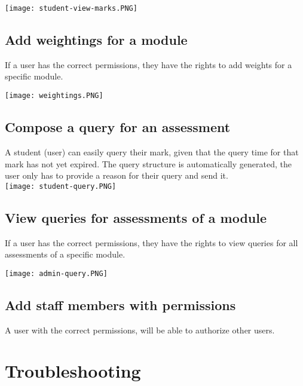 \documentclass[a4paper,12pt]{article}
\begin{document}
        \texttt{[image: student-view-marks.PNG]}\\[1.0cm]
        
        \subsection{Add weightings for a module}
        
        If a user has the correct permissions, they have the rights to add weights for a specific module. 
        
        \texttt{[image: weightings.PNG]}\\[1.0cm]
        
        \subsection{Compose a query for an assessment}
        
        A student (user) can easily query their mark, given that the query time for that mark has not yet expired. The query structure is automatically generated, the user only has to provide a reason for their query and send it.\\[1.0cm]
        
        \texttt{[image: student-query.PNG]}\\[1.0cm]
        
        \subsection{View queries for assessments of a module}
        
        If a user has the correct permissions, they have the rights to view queries for all assessments of a specific module.
        
        \texttt{[image: admin-query.PNG]}\\[1.0cm]
        
        \subsection{Add staff members with permissions}
        
        A user with the correct permissions, will be able to authorize other users.
    \pagebreak
     
    \section{Troubleshooting}
    
\end{document}
